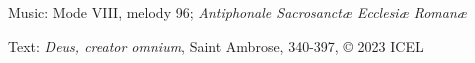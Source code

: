 


\begin{hymnsource}
Music: Mode VIII, melody 96; \emph{Antiphonale Sacrosanctæ Ecclesiæ Romanæ}

Text: \emph{Deus, creator omnium}, Saint Ambrose, 340-397, © 2023 ICEL
\end{hymnsource}
